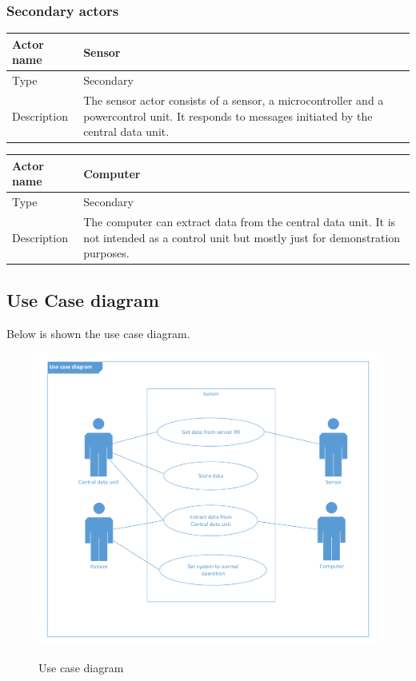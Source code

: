 \subsubsection{Secondary actors}

\begin{table}[H]
	\centering
	\begin{tabular}{|l|p{7cm}|}
	\hline
	Actor name & Sensor \\ \hline
	Type & Secondary \\ \hline
	Description & The sensor actor consists of a sensor, a microcontroller and a powercontrol unit. It responds to messages initiated by the central data unit.\\ \hline
	\end{tabular}
\end{table}

\begin{table}[H]
	\centering
	\begin{tabular}{|l|p{7cm}|}
	\hline
	Actor name & Computer \\ \hline
	Type & Secondary \\ \hline
	Description & The computer can extract data from the central data unit. It is not intended as a control unit but mostly just for demonstration purposes. \\ \hline
	\end{tabular}
\end{table}




\subsection{Use Case diagram}
Below is shown the use case diagram.
\begin{figure}[H]
\centering
\includegraphics*[width=.7\textwidth]{billeder/UseCase_vector}
\label{usecase_fig}
\caption{Use case diagram}
\end{figure}

